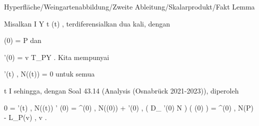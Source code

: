 {Hyperfläche/Weingartenabbildung/Zweite Ableitung/Skalarprodukt/Fakt}
{Lemma}
{}
{

\faktzusatz {}
\faktzusatz {}

}
{

Misalkan
\maabbeledisp {\gamma} { I } { Y
} { t } { \gamma(t)
} {,}
terdiferensialkan dua kali, dengan

\mavergleichskette
{\vergleichskette
{ \gamma(0)
}
{ = }{ P
}
{  }{
}
{    }{
}
{   }{
}
}
{}{}{}
dan

\mavergleichskette
{\vergleichskette
{ \gamma'(0)
}
{ = }{ v
}
{ \in }{ T_PY
}
{    }{
}
{   }{
}
}
{}{}{.}
Kita mempunyai

\mavergleichskettedisp
{\vergleichskette
{ \left\langle  \gamma'(t)  ,  N(\gamma(t))   \right\rangle
}
{ =} { 0
}
{ } {
}
{ } {
}
{ } {
}
}
{}{}{}
untuk semua

\mavergleichskette
{\vergleichskette
{ t
}
{ \in }{ I
}
{  }{
}
{    }{
}
{   }{
}
}
{}{}{}
sehingga, dengan
Soal 43.14 (Analysis (Osnabrück 2021-2023)), diperoleh

\mavergleichskettealign
{\vergleichskettealign
{ 0
}
{ =} { \left\langle  \gamma'(t)  ,  N(\gamma(t))   \right\rangle' (0)
}
{ =} { \left\langle  \gamma^{\prime \prime}(0)  ,  N(\gamma(0))  \right\rangle + \left\langle  \gamma'(0)  ,  \left(  D_{ \gamma'(0) }  N   \right) \left(   \gamma(0)   \right)   \right\rangle
}
{ =} { \left\langle  \gamma^{\prime \prime}(0) , N(P)  \right\rangle - \left\langle  L_P(v)  ,  v   \right\rangle
}
{ } {
}
}
{}
{}{.}

}

